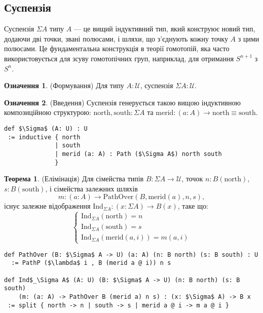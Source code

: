 \documentclass{article}
\theoremstyle{definition}
\newtheorem{theorem}{Теорема}
\newtheorem{definition}{Означення}
\begin{document}
\subsection{Суспензія}
Суспензія \(\Sigma A\) типу \( A \) — це вищий індуктивний тип, який
конструює новий тип, додаючи дві точки, звані полюсами, і шляхи, що з’єднують
кожну точку \( A \) з цими полюсами. Це фундаментальна конструкція в теорії гомотопій,
яка часто використовується для зсуву гомотопічних груп, наприклад, для отримання \( S^{n+1} \) з \( S^n \).

\begin{definition} (Формування)
Для типу \( A : \mathcal{U} \), суспензія \( \Sigma A : \mathcal{U} \).
\end{definition}

\begin{definition} (Введення)
Суспензія генерується такою вищою індуктивною композиційною структурою:
\( \text{north}, \text{south} : \Sigma A \) та \( \text{merid} : (a : A) \to \text{north} \equiv \text{south} \).
\begin{lstlisting}[mathescape=true]
def $\Sigma$ (A: U) : U
 := inductive { north
              | south
              | merid (a: A) : Path ($\Sigma A$) north south
              }
\end{lstlisting}
\end{definition}

\begin{theorem} (Елімінація)
Для сімейства типів \( B : \Sigma A \to \mathcal{U} \), точок \( n : B(\text{north}) \), \( s : B(\text{south}) \), і сімейства
залежних шляхів
\[
  m : (a : A) \to \text{PathOver}(B,\text{merid}(a),n,s),
\]
існує залежне відображення \( \text{Ind}_{\Sigma A} : (x : \Sigma A) \to B(x) \), таке що:
\[
\begin{cases}
\text{Ind}_{\Sigma A}(\text{north}) = n \\
\text{Ind}_{\Sigma A}(\text{south}) = s \\
\text{Ind}_{\Sigma A}(\text{merid}(a,i)) = m(a,i)
\end{cases}
\]
\begin{lstlisting}[mathescape=true]
def PathOver (B: $\Sigma$ A -> U) (a: A) (n: B north) (s: B south) : U
  := PathP ($\lambda$ i , B (merid a @ i)) n s

def Ind$_\Sigma A$ (A: U) (B: $\Sigma$ A -> U) (n: B north) (s: B south)
    (m: (a: A) -> PathOver B (merid a) n s) : (x: $\Sigma$ A) -> B x
 := split { north -> n | south -> s | merid a @ i -> m a @ i }
\end{lstlisting}
\end{theorem}
\end{document}
